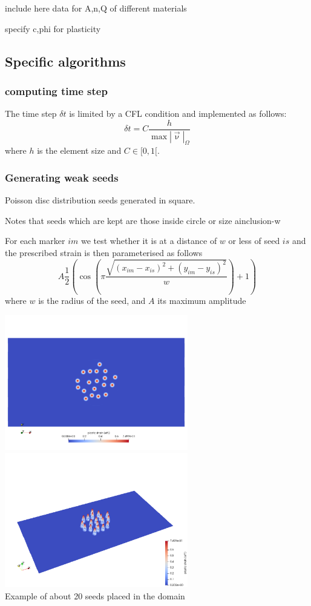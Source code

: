 \documentclass[a4paper]{article}
\begin{document}
include here data for A,n,Q of different materials

specify c,phi for plasticity



\subsection{Specific algorithms}

\subsubsection{computing time step}

The time step $\delta t$ is limited by a CFL condition and implemented
as follows:
\[
\delta t = C \frac{h}{\max |\vec\upnu|_\Omega}
\]
where $h$ is the element size and $C\in[0,1[$.

\subsubsection{Generating weak seeds}

Poisson disc distribution
seeds generated in square.

Notes that seeds which are kept are those inside circle or size ainclusion-w

For each marker $im$ we test whether it is at a distance of $w$ or less of 
seed $is$ and the prescribed strain is then parameterised as follows
\[
A \frac{1}{2} \left(\cos (\pi \frac{\sqrt{(x_{im}-x_{is})^2+(y_{im}-y_{is})^2}}{w}) +1 \right)
\]
where $w$ is the radius of the seed, and $A$ its maximum amplitude


\begin{center}
\includegraphics[width=8cm]{images/seeds1}
\includegraphics[width=8cm]{images/seeds2}\\
Example of about 20 seeds placed in the domain
\end{center}
\end{document}
